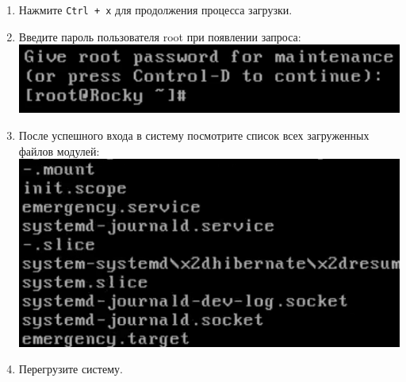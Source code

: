 \documentclass[12pt]{article}
\begin{document}
\begin{enumerate}
	\item Нажмите \texttt{Ctrl + x} для продолжения процесса загрузки.
	\item Введите пароль пользователя root при появлении запроса:
	      \\\includegraphics{8.png}
	\item После успешного входа в систему посмотрите список всех загруженных файлов модулей:
	      \\\includegraphics{9.png}
	\item Перегрузите систему.
\end{enumerate}
\end{document}
